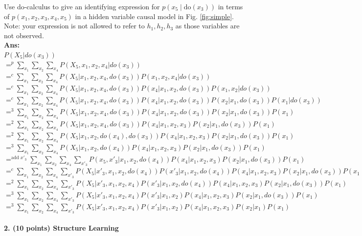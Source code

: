 \documentclass[11pt]{article}
\begin{document}
Use do-calculus to give an identifying expression for
$p(x_5 \mid \text{do}(x_3))$ in terms of $p(x_1,x_2,x_3,x_4,x_5)$
in a hidden variable causal model in Fig. \ref{fig:simple}.  Note: your expression is not allowed
to refer to $h_1,h_2,h_3$ as those variables are not observed.\\
\textbf{Ans:}\\
$P(X_5 | do(x_3))$\\
$=^p\sum_{x_1}\sum_{x_2}\sum_{x_4}P(X_5, x_1, x_2, x_4|do(x_3))$\\
$=^c\sum_{x_1}\sum_{x_2}\sum_{x_4}P(X_5|x_1, x_2, x_4, do(x_3))P(x_1, x_2, x_4|do(x_3))$\\
$=^c\sum_{x_1}\sum_{x_2}\sum_{x_4}P(X_5|x_1, x_2, x_4, do(x_3))P(x_4|x_1, x_2, do(x_3))P(x_1, x_2|do(x_3))$\\
$=^c\sum_{x_1}\sum_{x_2}\sum_{x_4}P(X_5|x_1, x_2, x_4, do(x_3))P(x_4|x_1, x_2, do(x_3))P(x_2|x_1, do(x_3))P(x_1|do(x_3))$\\
$=^3\sum_{x_1}\sum_{x_2}\sum_{x_4}P(X_5|x_1, x_2, x_4, do(x_3))P(x_4|x_1, x_2, do(x_3))P(x_2|x_1, do(x_3))P(x_1)$\\
%
$=^2\sum_{x_1}\sum_{x_2}\sum_{x_4}P(X_5|x_1, x_2, x_4, do(x_3))P(x_4|x_1, x_2, x_3)P(x_2|x_1, do(x_3))P(x_1)$\\
$=^2\sum_{x_1}\sum_{x_2}\sum_{x_4}P(X_5|x_1, x_2, do(x_4), do(x_3))P(x_4|x_1, x_2, x_3)P(x_2|x_1, do(x_3))P(x_1)$\\
$=^3\sum_{x_1}\sum_{x_2}\sum_{x_4}P(X_5|x_1, x_2, do(x_4))P(x_4|x_1, x_2, x_3)P(x_2|x_1, do(x_3))P(x_1)$\\
$=^{\text{add } x'_3}\sum_{x_1}\sum_{x_2}\sum_{x_4}\sum_{x'_3}P(x_5, x'_3|x_1, x_2, do(x_4))P(x_4|x_1, x_2, x_3)P(x_2|x_1, do(x_3))P(x_1)$\\
$=^c\sum_{x_1}\sum_{x_2}\sum_{x_4}\sum_{x'_3}P(X_5|x'_3, x_1, x_2, do(x_4))P(x'_3|x_1, x_2, do(x_4))P(x_4|x_1, x_2, x_3)P(x_2|x_1, do(x_3))P(x_1)$
$=^2\sum_{x_1}\sum_{x_2}\sum_{x_4}\sum_{x'_3}P(X_5|x'_3, x_1, x_2, x_4)P(x'_3|x_1, x_2, do(x_4))P(x_4|x_1, x_2, x_3)P(x_2|x_1, do(x_3))P(x_1)$
$=^3\sum_{x_1}\sum_{x_2}\sum_{x_4}\sum_{x'_3}P(X_5|x'_3, x_1, x_2, x_4)P(x'_3|x_1, x_2)P(x_4|x_1, x_2, x_3)P(x_2|x_1, do(x_3))P(x_1)$
$=^3\sum_{x_1}\sum_{x_2}\sum_{x_4}\sum_{x'_3}P(X_5|x'_3, x_1, x_2, x_4)P(x'_3|x_1, x_2)P(x_4|x_1, x_2, x_3)P(x_2|x_1)P(x_1)$



\paragraph{2. (10 points) Structure Learning}
\end{document}
